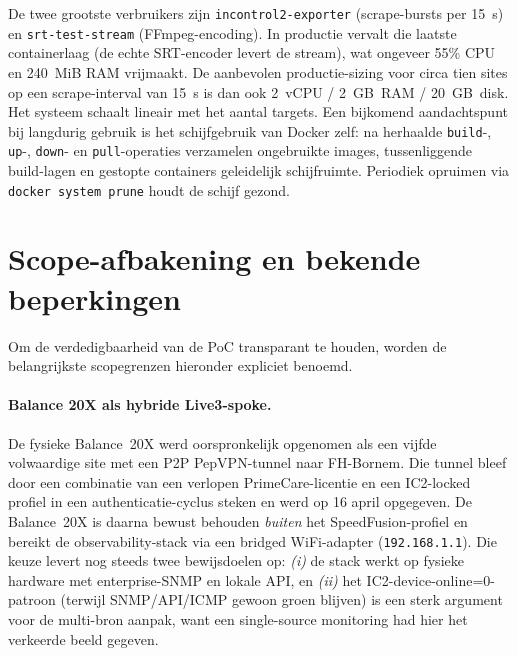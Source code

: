 De twee grootste verbruikers zijn \texttt{incontrol2-exporter} (scrape-bursts per 15~s) en \texttt{srt-test-stream} (FFmpeg-encoding). In productie vervalt die laatste containerlaag (de echte SRT-encoder levert de stream), wat ongeveer 55\% CPU en 240~MiB RAM vrijmaakt. De aanbevolen productie-sizing voor circa tien sites op een scrape-interval van 15~s is dan ook 2~vCPU / 2~GB~RAM / 20~GB~disk. Het systeem schaalt lineair met het aantal targets. Een bijkomend aandachtspunt bij langdurig gebruik is het schijfgebruik van Docker zelf: na herhaalde \texttt{build}-, \texttt{up}-, \texttt{down}- en \texttt{pull}-operaties verzamelen ongebruikte images, tussenliggende build-lagen en gestopte containers geleidelijk schijfruimte. Periodiek opruimen via \texttt{docker system prune} houdt de schijf gezond.

\section{Scope-afbakening en bekende beperkingen}
\label{sec:poc-scope}

Om de verdedigbaarheid van de PoC transparant te houden, worden de belangrijkste scopegrenzen hieronder expliciet benoemd.

\paragraph{Balance 20X als hybride Live3-spoke.} De fysieke Balance~20X werd oorspronkelijk opgenomen als een vijfde volwaardige site met een P2P PepVPN-tunnel naar FH-Bornem. Die tunnel bleef door een combinatie van een verlopen PrimeCare-licentie en een IC2-locked profiel in een authenticatie-cyclus steken en werd op 16 april opgegeven. De Balance~20X is daarna bewust behouden \emph{buiten} het SpeedFusion-profiel en bereikt de observability-stack via een bridged WiFi-adapter (\texttt{192.168.1.1}). Die keuze levert nog steeds twee bewijsdoelen op: \emph{(i)} de stack werkt op fysieke hardware met enterprise-SNMP en lokale API, en \emph{(ii)} het IC2-device-online=0-patroon (terwijl SNMP/API/ICMP gewoon groen blijven) is een sterk argument voor de multi-bron aanpak, want een single-source monitoring had hier het verkeerde beeld gegeven.

